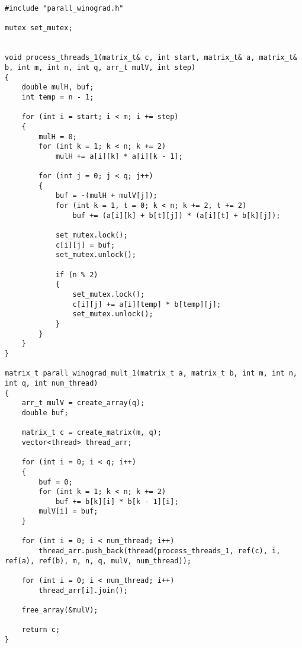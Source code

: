 \begin{lstlisting}[label=code2, caption = Распараллеленный алгоритм Винограда (1 вариант)]
#include "parall_winograd.h"

mutex set_mutex;


void process_threads_1(matrix_t& c, int start, matrix_t& a, matrix_t& b, int m, int n, int q, arr_t mulV, int step)
{
	double mulH, buf;
	int temp = n - 1;
	
	for (int i = start; i < m; i += step)
	{
		mulH = 0;
		for (int k = 1; k < n; k += 2)
			mulH += a[i][k] * a[i][k - 1];
		
		for (int j = 0; j < q; j++)
		{
			buf = -(mulH + mulV[j]);
			for (int k = 1, t = 0; k < n; k += 2, t += 2)
				buf += (a[i][k] + b[t][j]) * (a[i][t] + b[k][j]);
			
			set_mutex.lock();
			c[i][j] = buf;
			set_mutex.unlock();
			
			if (n % 2)
			{
				set_mutex.lock();
				c[i][j] += a[i][temp] * b[temp][j];
				set_mutex.unlock();
			}
		}
	}
}

matrix_t parall_winograd_mult_1(matrix_t a, matrix_t b, int m, int n, int q, int num_thread)
{
	arr_t mulV = create_array(q);
	double buf;
	
	matrix_t c = create_matrix(m, q);
	vector<thread> thread_arr;
	
	for (int i = 0; i < q; i++)
	{
		buf = 0;
		for (int k = 1; k < n; k += 2)
			buf += b[k][i] * b[k - 1][i];
		mulV[i] = buf;
	}
	
	for (int i = 0; i < num_thread; i++)
		thread_arr.push_back(thread(process_threads_1, ref(c), i, ref(a), ref(b), m, n, q, mulV, num_thread));
	
	for (int i = 0; i < num_thread; i++)
		thread_arr[i].join();
	
	free_array(&mulV);
	
	return c;
}

\end{lstlisting}

